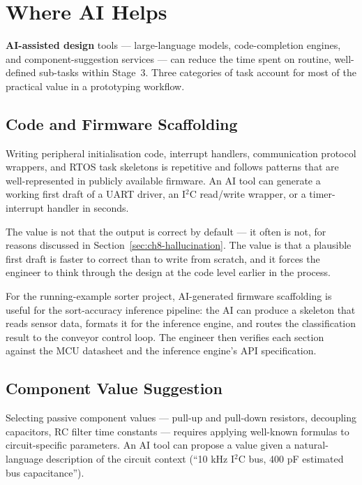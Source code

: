 \section{Where AI Helps}
\label{sec:ch8-helps}

\textbf{AI-assisted design} tools --- large-language
models, code-completion engines, and component-suggestion services --- can
reduce the time spent on routine, well-defined sub-tasks within Stage~3.
Three categories of task account for most of the practical value in a
prototyping workflow.

\subsection{Code and Firmware Scaffolding}
\label{sec:ch8-helps-code}

Writing peripheral initialisation code, interrupt handlers, communication
protocol wrappers, and RTOS task skeletons is repetitive and follows patterns
that are well-represented in publicly available firmware.
An AI tool can generate a working first draft of a UART driver, an I$^2$C
read/write wrapper, or a timer-interrupt handler in seconds.

The value is not that the output is correct by default --- it often is not, for
reasons discussed in Section~\ref{sec:ch8-hallucination}.
The value is that a plausible first draft is faster to correct than to write
from scratch, and it forces the engineer to think through the design at the
code level earlier in the process.

For the running-example sorter project, AI-generated firmware scaffolding is
useful for the sort-accuracy inference pipeline: the AI can produce a skeleton
that reads sensor data, formats it for the inference engine, and routes the
classification result to the conveyor control loop.
The engineer then verifies each section against the MCU datasheet and the
inference engine's API specification.

\subsection{Component Value Suggestion}
\label{sec:ch8-helps-component}

Selecting passive component values --- pull-up and pull-down resistors,
decoupling capacitors, RC filter time constants --- requires applying well-known
formulas to circuit-specific parameters.
An AI tool can propose a value given a natural-language description of the
circuit context (``10 kHz I$^2$C bus, 400 pF estimated bus capacitance'').

